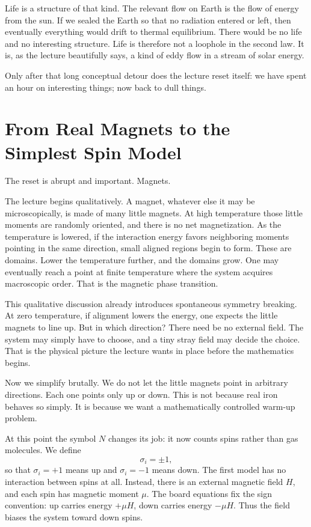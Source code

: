 Life is a structure of that kind. The relevant flow on Earth is the flow of energy from the sun. If we sealed the Earth so that no radiation entered or left, then eventually everything would drift to thermal equilibrium. There would be no life and no interesting structure. Life is therefore not a loophole in the second law. It is, as the lecture beautifully says, a kind of eddy flow in a stream of solar energy.

Only after that long conceptual detour does the lecture reset itself: we have spent an hour on interesting things; now back to dull things.

\section{From Real Magnets to the Simplest Spin Model}

The reset is abrupt and important. Magnets.

The lecture begins qualitatively. A magnet, whatever else it may be microscopically, is made of many little magnets. At high temperature those little moments are randomly oriented, and there is no net magnetization. As the temperature is lowered, if the interaction energy favors neighboring moments pointing in the same direction, small aligned regions begin to form. These are domains. Lower the temperature further, and the domains grow. One may eventually reach a point at finite temperature where the system acquires macroscopic order. That is the magnetic phase transition.

This qualitative discussion already introduces spontaneous symmetry breaking. At zero temperature, if alignment lowers the energy, one expects the little magnets to line up. But in which direction? There need be no external field. The system may simply have to choose, and a tiny stray field may decide the choice. That is the physical picture the lecture wants in place before the mathematics begins.

Now we simplify brutally. We do not let the little magnets point in arbitrary directions. Each one points only up or down. This is not because real iron behaves so simply. It is because we want a mathematically controlled warm-up problem.

At this point the symbol \(N\) changes its job: it now counts spins rather than gas molecules. We define
\begin{equation}
\sigma_i=\pm 1,
\end{equation}
so that \(\sigma_i=+1\) means up and \(\sigma_i=-1\) means down. The first model has no interaction between spins at all. Instead, there is an external magnetic field \(H\), and each spin has magnetic moment \(\mu\). The board equations fix the sign convention: up carries energy \(+\mu H\), down carries energy \(-\mu H\). Thus the field biases the system toward down spins.

